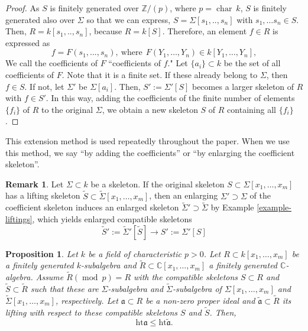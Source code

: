 \documentclass[a4paper]{amsart}
\def\CC{{\mathbb{C}}}
\def\ZZ{{\mathbb{Z}}}
\renewcommand{\a}{{\mathfrak{a}}}
\newcommand{\cha}{{\operatorname{char}}}
\newcommand{\height}{{\mathrm{ht} }}
\renewcommand{\wr}{{\widetilde R}}
\newcommand{\taa}{{\widetilde{\mathfrak a}}}
\newcommand{\ws}{{\widetilde{S}}}
\newcommand{\wsig}{{\widetilde{\Sigma}}}
\renewcommand{\mod}{{\operatorname{mod}\ }}
\newtheorem{prop}[thm]{Proposition}
\theoremstyle{definition}
\newtheorem{rem}[thm]{Remark}
\begin{document}
\begin{proof}
   As $S$ is finitely generated over $\ZZ/(p)$, where $p=\cha \ k$, $S$ is  finitely generated also over $\Sigma$
    so that we can express,  $S=\Sigma[s_1,..,s_n]$ with $s_1,\ldots s_n\in S$.
  Then, $R=k [s_1,..,s_n]$, because $R=k[S]$.
 Therefore, an element  $f \in R$ is expressed as 
% 
 $$ f = F(s_1,...,s_n),\ \mbox{where}\ \   F(Y_1,\ldots,Y_n)\in k[Y_1,\ldots,Y_n],$$
   We call the coefficients of $F$ ``coefficients of $f$."
      Let $\{ a_i \}\subset k$ be the set of all coefficients of $F$.
      Note that it is a finite set.
      If these  already belong to $\Sigma$, then  $f \in S$.
      If not, let $\Sigma'$ be $\Sigma[ a_i ]$.
      Then, $S' := \Sigma' [S]$ becomes a larger skeleton of $R $ with $f\in S'$.
      In this way, adding the coefficients of the finite number of elements $\{f_i\}$ of $R$ to the original $\Sigma$,
      we obtain a new skeleton $S$ of $R$ containing all $\{f_i\}$.
      \end{proof}
This extension method is used repeatedly throughout the paper.
When we use this method, we say ``by adding the coefficients'' or ``by enlarging the coefficient skeleton''.

\begin{rem} Let $\Sigma\subset k$ be a skeleton.
If the original skeleton $S\subset \Sigma[x_1,\ldots,x_m]$ has a lifting skeleton 
$\ws\subset \wsig[x_1,\ldots,x_m]$, 
then an enlarging $\Sigma'\supset \Sigma$ of the coefficient skeleton 
induces an enlarged skeleton $\wsig'\supset \wsig$ by Example \ref{example-liftings}, which yields enlarged
compatible skeletons 
$$\ws':=\wsig'[\ws]\to S':=\Sigma'[S]$$ 
\end{rem}




\begin{prop} \label{height-of-skeletons}
       Let $k$ be a field of characteristic $p>0$.
        Let $R\subset k[x_1,\ldots, x_m]$ be a finitely generated $k$-subalgebra and
        $\wr\subset \CC[x_1,\ldots, x_m]$ a finitely generated $\CC$-algebra.
        Assume $\wr (\mod p)=R$ with the compatible skeletons $S\subset R$ and $\ws\subset \wr$ 
        such that these are $\Sigma$-subalgebra and $\wsig$-subalgebra of $\Sigma[x_1,\ldots, x_m]$ and
        $\wsig[x_1,\ldots, x_m]$, respectively.
        Let $\a\subset R$ be a non-zero proper ideal and $\taa\subset \wr$ its lifting with respect to 
        these compatible skeletons $S$ and $\ws$.
                Then, $$\height \a\leq \height \taa.$$
\end{prop}
\end{document}
